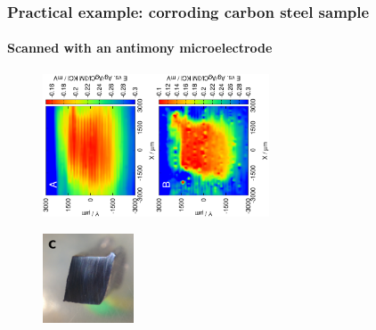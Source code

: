 \documentclass{beamer}
\begin{document}
\begin{frame}
\frametitle{Practical example: corroding carbon steel sample}
\framesubtitle{Scanned with an antimony microelectrode}
\begin{figure}
\centering
\includegraphics[trim = 10mm 30mm 0mm 10mm, clip, width=0.3\textwidth, angle=-90]{16012906.eps}\includegraphics[trim = 10mm 30mm 0mm 10mm, clip, width=0.3\textwidth, angle=-90]{16012906_deconvoluted.eps}

\includegraphics[width=0.24\textwidth]{cs_cut.jpg}

\end{figure}
\end{frame}
\end{document}
